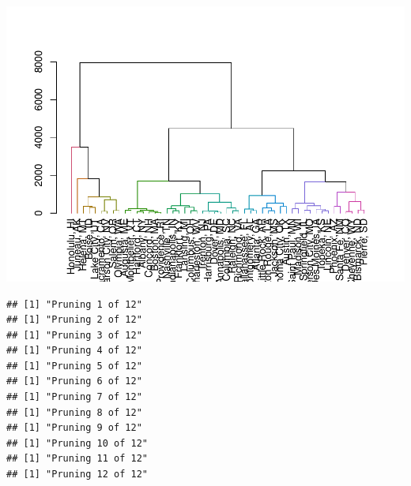 \documentclass[
]{article}
\begin{document}
\includegraphics{graphics/chunk-distances-hclust-euclidean-sub-1.pdf}

\begin{verbatim}
## [1] "Pruning 1 of 12"
## [1] "Pruning 2 of 12"
## [1] "Pruning 3 of 12"
## [1] "Pruning 4 of 12"
## [1] "Pruning 5 of 12"
## [1] "Pruning 6 of 12"
## [1] "Pruning 7 of 12"
## [1] "Pruning 8 of 12"
## [1] "Pruning 9 of 12"
## [1] "Pruning 10 of 12"
## [1] "Pruning 11 of 12"
## [1] "Pruning 12 of 12"
\end{verbatim}
\end{document}

